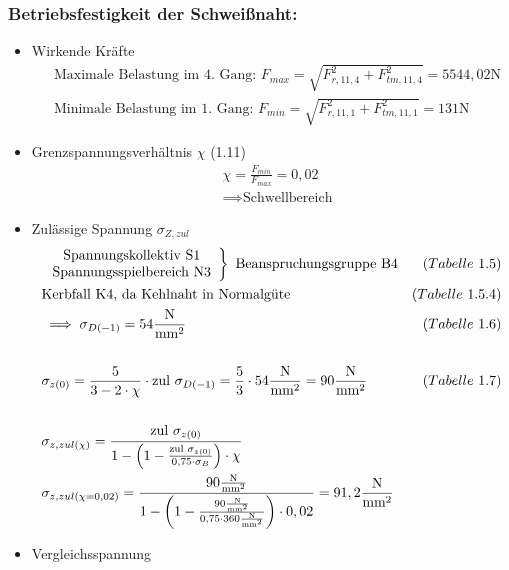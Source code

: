\subsubsection{Betriebsfestigkeit der Schweißnaht:}
\begin{itemize}
\item Wirkende Kräfte
	\begin{align*}
	&\text{Maximale Belastung im 4. Gang: }F_{max} = \sqrt{F_{r,11,4}^2 + F_{tm,11,4}^2 } = 5544,02 \text{N} \\
	&\text{Minimale Belastung im 1. Gang: } F_{min} = \sqrt{F_{r,11,1}^2 + F_{tm,11,1}^2 } = 131 \text{N} 
	\end{align*}
\item Grenzspannungsverhältnis $\chi$ \hfill (1.11)
	\begin{align*}
	& \chi = \frac{F_{min}}{F_{max}} = 0,02 \\
	& \implies \text{Schwellbereich}
\end{align*}
\item Zulässige Spannung $\sigma_{Z,zul}$ 
	\begin{align*}
	&\left. \begin{array}{c} \text{Spannungskollektiv S1}\\\text{Spannungsspielbereich N3} \end{array} \right\} \text{ Beanspruchungsgruppe B4} &(Tabelle\text{ }1.5)\\
	&\text{Kerbfall K4, da Kehlnaht in Normalgüte}  &(Tabelle \text{ }1.5.4) \\
	&\implies \sigma_{D(-1)} = 54 \frac{\text{N}}{\text{mm}^2} &(Tabelle\text{ } 1.6) \\ \\
	&\sigma_{z(0)} = \frac{5}{3-2 \cdot \chi} \cdot \text{zul } \sigma_{D(-1)} = \frac{5}{3} \cdot 54 \frac{\text{N}}{\text{mm}^2} = 90 \frac{\text{N}}{\text{mm}^2} &(Tabelle\text{ } 1.7) \\ \\
	&\sigma_{z,zul (\chi)} = \frac{\text{zul } \sigma_{z(0)}}{1- \left( 1 - \frac{\text{zul } \sigma_{z(0)}}{0,75 \cdot \sigma_B} \right)\cdot \chi}  \\
	&\sigma_{z,zul (\chi = 0,02)} = \frac{90 \frac{\text{N}}{\text{mm}^2}}{1- \left( 1 - \frac{90 \frac{\text{N}}{\text{mm}^2}}{0,75 \cdot 360\frac{\text{N}}{\text{mm}^2}} \right)\cdot 0,02} = 91,2 \frac{\text{N}}{\text{mm}^2} 
	\end{align*}
\item Vergleichsspannung
	\begin{align*}

\end{align*}
\end{itemize}
